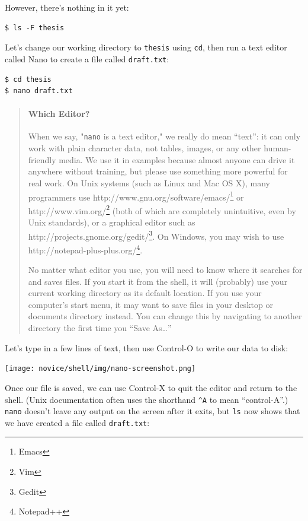 \documentclass[]{book}
\newcommand{\urlfoot}[2]{{#1}\footnote{#2}}
\begin{document}
However, there's nothing in it yet:

\begin{verbatim}
$ ls -F thesis
\end{verbatim}

Let's change our working directory to \texttt{thesis} using \texttt{cd},
then run a text editor called Nano to create a file called
\texttt{draft.txt}:

\begin{verbatim}
$ cd thesis
$ nano draft.txt
\end{verbatim}

\begin{quote}
\mbox{}\paragraph{Which Editor?}

When we say, "\texttt{nano} is a text editor," we really do mean
``text'': it can only work with plain character data, not tables,
images, or any other human-friendly media. We use it in examples because
almost anyone can drive it anywhere without training, but please use
something more powerful for real work. On Unix systems (such as Linux
and Mac OS X), many programmers use
\urlfoot{http://www.gnu.org/software/emacs/}{Emacs} or
\urlfoot{http://www.vim.org/}{Vim} (both of which are completely
unintuitive, even by Unix standards), or a graphical editor such as
\urlfoot{http://projects.gnome.org/gedit/}{Gedit}. On Windows, you may wish
to use \urlfoot{http://notepad-plus-plus.org/}{Notepad++}.

No matter what editor you use, you will need to know where it searches
for and saves files. If you start it from the shell, it will (probably)
use your current working directory as its default location. If you use
your computer's start menu, it may want to save files in your desktop or
documents directory instead. You can change this by navigating to
another directory the first time you ``Save As\ldots{}''
\end{quote}

Let's type in a few lines of text, then use Control-O to write our data
to disk:

\texttt{[image: novice/shell/img/nano-screenshot.png]}

Once our file is saved, we can use Control-X to quit the editor and
return to the shell. (Unix documentation often uses the shorthand
\texttt{\^{}A} to mean ``control-A''.) \texttt{nano} doesn't leave any
output on the screen after it exits, but \texttt{ls} now shows that we
have created a file called \texttt{draft.txt}:
\end{document}
